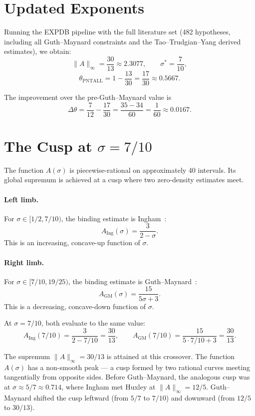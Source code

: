\documentclass[11pt,a4paper]{article}
\begin{document}
\section{Updated Exponents}

Running the EXPDB pipeline with the full literature set (482 hypotheses, including all Guth--Maynard constraints and the Tao--Trudgian--Yang derived estimates), we obtain:
\[
  \|A\|_{\infty} = \frac{30}{13} \approx 2.3077,
  \qquad
  \sigma^{*} = \frac{7}{10},
\]
\[
  \theta_{\mathrm{PNTALL}} = 1 - \frac{13}{30} = \frac{17}{30} \approx 0.5667.
\]

The improvement over the pre-Guth--Maynard value is
\[
  \Delta\theta = \frac{7}{12} - \frac{17}{30}
  = \frac{35 - 34}{60} = \frac{1}{60} \approx 0.0167.
\]

\section{The Cusp at \texorpdfstring{$\sigma = 7/10$}{sigma = 7/10}}

The function $A(\sigma)$ is piecewise-rational on approximately 40 intervals.  Its global supremum is achieved at a cusp where two zero-density estimates meet.

\paragraph{Left limb.}  For $\sigma \in [1/2, 7/10)$, the binding estimate is Ingham~\cite{Ing40}:
\[
  A_{\mathrm{Ing}}(\sigma) = \frac{3}{2 - \sigma}.
\]
This is an increasing, concave-up function of $\sigma$.

\paragraph{Right limb.}  For $\sigma \in [7/10, 19/25)$, the binding estimate is Guth--Maynard~\cite{GM24}:
\[
  A_{\mathrm{GM}}(\sigma) = \frac{15}{5\sigma + 3}.
\]
This is a decreasing, concave-down function of $\sigma$.

At $\sigma = 7/10$, both evaluate to the same value:
\[
  A_{\mathrm{Ing}}(7/10) = \frac{3}{2 - 7/10} = \frac{30}{13},
  \qquad
  A_{\mathrm{GM}}(7/10) = \frac{15}{5 \cdot 7/10 + 3} = \frac{30}{13}.
\]

The supremum $\|A\|_{\infty} = 30/13$ is attained at this crossover.  The function $A(\sigma)$ has a non-smooth peak --- a cusp formed by two rational curves meeting tangentially from opposite sides.  Before Guth--Maynard, the analogous cusp was at $\sigma \approx 5/7 \approx 0.714$, where Ingham met Huxley at $\|A\|_{\infty} = 12/5$.  Guth--Maynard shifted the cusp leftward (from $5/7$ to $7/10$) and downward (from $12/5$ to $30/13$).
\end{document}
